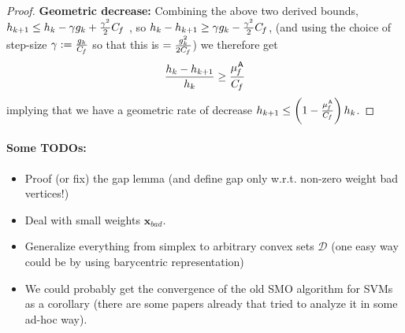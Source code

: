 \documentclass{article} %
\newcommand{\domain}{\mathcal{D}}
\newcommand{\stepsize}{\gamma}
\newcommand{\away}{{\hspace{0.06em}\textsf{A}}}
\newcommand{\Cf}{C_{\hspace{-0.08em}f}}
\newcommand{\strongConvMFW}{\mu_{\hspace{-0.08em}f}^\away}
\newcommand{\x}{\bm{x}}
\newcommand{\0}{\mathbf{0}} %
\begin{document}
{\begin{proof}
\textbf{Geometric decrease:} Combining the above two derived bounds,
$h_{k+1} \le h_k - \stepsize g_k + \frac{\stepsize^2}{2} \Cf$%
, so $h_k - h_{k+1} \ge \stepsize g_k - \frac{\stepsize^2}{2} \Cf$, 
(and using the choice of step-size $\stepsize:=\frac{g_k}{\Cf}$ so that this is $= \frac{g_k^2}{2\Cf}$) %
we therefore get
\[
\frac{h_k - h_{k+1} }{h_k} \ge \frac{\strongConvMFW}{\Cf}
\]
implying that we have a geometric rate of decrease $h_{k+1} \leq \left(1-\frac{\strongConvMFW}{\Cf}\right) h_k$.
\end{proof}

\paragraph{Some TODOs:}
\begin{itemize}
\item Proof (or fix) the gap lemma (and define gap only w.r.t. non-zero weight bad vertices!)
\item Deal with small weights $\x_{bad}$.
\item Generalize everything from simplex to arbitrary convex sets $\domain$ (one easy way could be by using barycentric representation)
\item We could probably get the convergence of the old SMO algorithm for SVMs as a corollary (there are some papers already that tried to analyze it in some ad-hoc way).
\end{itemize}
}

%
%
%
%
%
%
%
%
%
%
%
%
%
%
%
%
%
%
%
%
%
%
%
%
%
%
%
%
%
%
%
%
%
%
%
%
%
%



%
%
%
%
%
%
%
%
%
%
%
%
%
%
%
%
%
%
%
%
%
%

%
%
%
%
%
%
%
%
%
%
%
%
%
%
%
%
%
%
%
%
%
%
%
%


%
%
%
%
%
%
%
%
%
%
%
%
%
%
%
%
%
%
%
%
%
%
%
%
%
%
%
%
%
%
%
%
%
%
%
%
%
%
%
%
%
%
%
%
%
%
%
%
%
%
%
%
%
%
%
%
%
%
%
%
%
%
%
%
%
%
%
%
%
%
%
%
%
%
%
%
%
%
%
%
%
%
%
%
%
%
%
%
%
%
%
%
%
%
%
%
%
%
%

%
\end{document}
